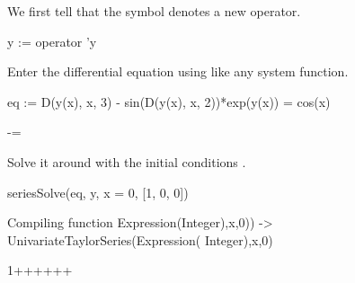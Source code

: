 {{{{{{{{{{{{{{{{\begin{xtc}
\begin{xtccomment}
We first tell \Language{}
that the symbol  denotes a new operator.
\end{xtccomment}
\begin{spadsrc}
y := operator 'y 
\end{spadsrc}
\begin{TeXOutput}
\begin{fricasmath}{1}
%
\end{fricasmath}
\end{TeXOutput}
\end{xtc}
\begin{xtc}
\begin{xtccomment}
Enter the differential equation using  like any system
function.
\end{xtccomment}
\begin{spadsrc}
eq := D(y(x), x, 3) - sin(D(y(x), x, 2))*exp(y(x)) = cos(x)
\end{spadsrc}
\begin{TeXOutput}
\begin{fricasmath}{2}
-{\TIMES {}}=%
\end{fricasmath}
\end{TeXOutput}
\end{xtc}
%
\begin{xtc}
\begin{xtccomment}
Solve it around  with the initial conditions
.
\end{xtccomment}
\begin{spadsrc}
seriesSolve(eq, y, x = 0, [1, 0, 0])
\end{spadsrc}
\begin{MessageOutput}
   Compiling function %
      Expression(Integer),x,0)) -> UnivariateTaylorSeries(Expression(
      Integer),x,0) 
\end{MessageOutput}
\begin{TeXOutput}
\begin{fricasmath}{3}
1+\TIMES {}+\TIMES {}+\TIMES {}+\TIMES {}+\TIMES {}+%
\end{fricasmath}
\end{TeXOutput}
\end{xtc}

}}}}}}}}}}}}}}}}
